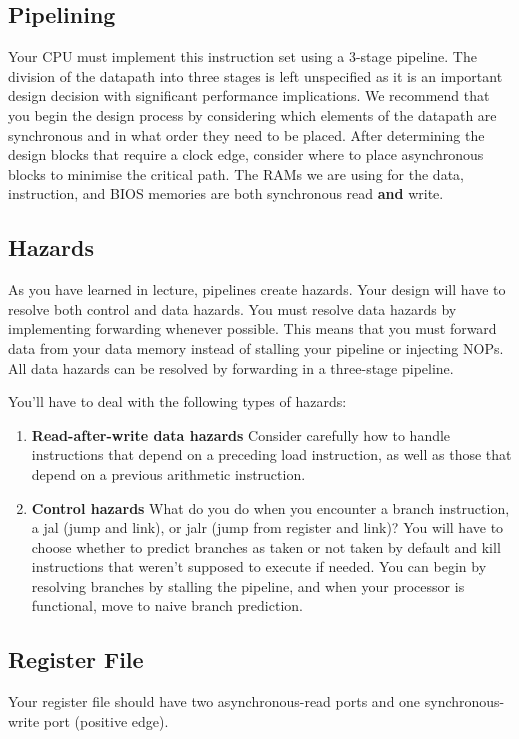 \documentclass[11pt]{article}
\begin{document}
\subsection{Pipelining}
Your CPU must implement this instruction set using a 3-stage pipeline.
The division of the datapath into three stages is left unspecified as it is an important design decision with significant performance implications.
We recommend that you begin the design process by considering which elements of the datapath are synchronous and in what order they need to be placed.
After determining the design blocks that require a clock edge, consider where to place asynchronous blocks to minimise the critical path.
The RAMs we are using for the data, instruction, and BIOS memories are both synchronous read \textbf{and} write.

\subsection{Hazards}
As you have learned in lecture, pipelines create hazards.
Your design will have to resolve both control and data hazards.
You must resolve data hazards by implementing forwarding whenever possible.
This means that you must forward data from your data memory instead of stalling your pipeline or injecting NOPs.
All data hazards can be resolved by forwarding in a three-stage pipeline.

You'll have to deal with the following types of hazards:
\begin{enumerate}
  \item \textbf{Read-after-write data hazards} Consider carefully how to handle instructions that depend on a preceding load instruction, as well as those that depend on a previous arithmetic instruction.
  \item \textbf{Control hazards} What do you do when you encounter a branch instruction, a jal (jump and link), or jalr (jump from register and link)?
    You will have to choose whether to predict branches as taken or not taken by default and kill instructions that weren't supposed to execute if needed.
    You can begin by resolving branches by stalling the pipeline, and when your processor is functional, move to naive branch prediction.
\end{enumerate}

\subsection{Register File}
\label{reg_file}
Your register file should have two asynchronous-read ports and one synchronous-write port (positive edge).
\end{document}
